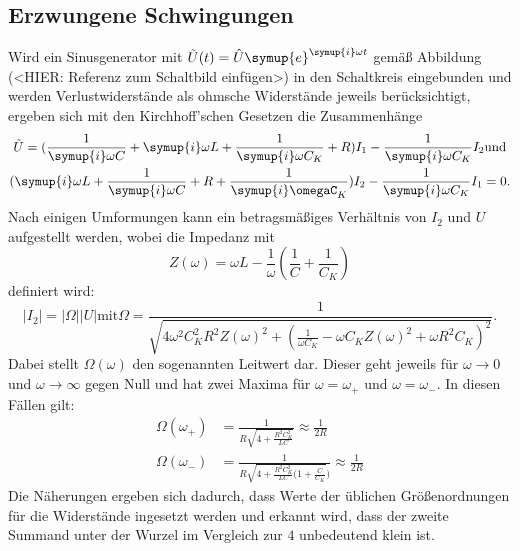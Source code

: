 \subsection{Erzwungene Schwingungen}
Wird ein Sinusgenerator mit ${\tilde{U}(t)=\hat{U}\symup{e}^{\symup{i}\omega t}}$ gemäß Abbildung (<HIER: Referenz zum Schaltbild einfügen>) in den Schaltkreis 
eingebunden und werden Verlustwiderstände als ohmsche Widerstände jeweils berücksichtigt, ergeben sich mit den Kirchhoff'schen 
Gesetzen die Zusammenhänge 
\begin{gather}
    \tilde{U}=(\frac{1}{\symup{i}\omega C} +  \symup{i} \omega L + \frac{1}{\symup{i}\omega C_K} + R)I_1 - \frac{1}{\symup{i}\omega C_K} I_2 \text{und} \\
    (\symup{i}\omega L + \frac{1}{\symup{i}\omega C} + R+ \frac{1}{\symup{i}\omegaC_K}) I_2 - \frac{1}{\symup{i}\omega C_K}I_1 =0 \text{.}
\end{gather}
Nach einigen Umformungen kann ein betragsmäßiges Verhältnis von $I_2$ und $U$ aufgestellt werden, wobei die Impedanz mit 
\begin{equation*}
    Z(\omega) = \omega L - \frac{1}{\omega} (\frac{1}{C} + \frac{1}{C_K})    
\end{equation*}
definiert wird:
\begin{equation}
    \lvert I_2 \rvert = \lvert \Omega \rvert \lvert U \rvert \text{mit} 
    \Omega = \frac{1}{\sqrt{4 \omega ^2 C_K^2 R^2 Z(\omega)^2 + (\frac{1}{\omega C_K} - \omega C_K Z(\omega)^2 + \omega R^2 C_K)^2 }} .
\end{equation}
Dabei stellt $\Omega (\omega)$ den sogenannten Leitwert dar. 
Dieser geht jeweils für ${\omega \to 0}$ und ${\omega \to \infty }$ gegen Null und hat zwei Maxima für ${\omega = \omega _+}$ und 
${\omega = \omega _-}$. 
In diesen Fällen gilt:
\begin{align}
    \Omega (\omega _+) &= \frac{1}{R\sqrt{4 + \frac{R^2C_K^2}{LC}}} \approx \frac{1}{2R} \\
    \Omega (\omega _-) &= \frac{1}{R\sqrt{4 + \frac{R^2C_K^2}{LC}(1 + \frac{C}{C_K}})} \approx \frac{1}{2R}  
\end{align}
Die Näherungen ergeben sich dadurch, dass Werte der üblichen Größenordnungen für die Widerstände ingesetzt werden und erkannt
wird, dass der zweite Summand unter der Wurzel im Vergleich zur $4$ unbedeutend klein ist. 
